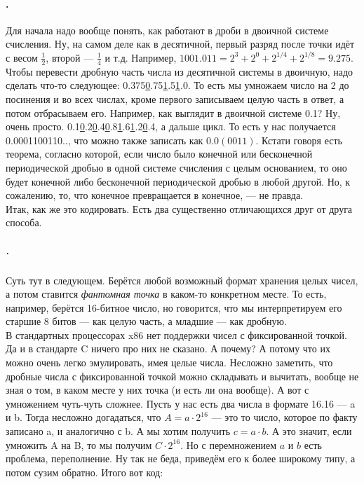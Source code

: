 \documentclass{article}
\begin{document}
    \paragraph{.}
    Для начала надо вообще понять, как работают в дроби в двоичной системе счисления. Ну, на самом деле как в десятичной, первый разряд после точки идёт с весом $\frac12$, второй --- $\frac14$ и т.д. Например, $1001.011=2^3+2^0+2^{1/4}+2^{1/8}=9.275$. Чтобы перевести дробную часть числа из десятичной системы в двоичную, надо сделать что-то следующее: 0.375\textrightarrow\underline0.75\textrightarrow\underline1.5\textrightarrow\underline1.0. То есть мы умножаем число на 2 до посинения и во всех числах, кроме первого записываем целую часть в ответ, а потом отбрасываем его. Например, как выглядит в двоичной системе 0.1? Ну, очень просто. 0.1\textrightarrow\underline0.2\textrightarrow\underline0.4\textrightarrow\underline0.8\textrightarrow\underline1.6\textrightarrow\underline1.2\textrightarrow\underline0.4, а дальше цикл. То есть у нас получается 0.0001100110.., что можно также записать как $0.0(0011)$. Кстати говоря есть теорема, согласно которой, если число было конечной или бесконечной периодической дробью в одной системе счисления с целым основанием, то оно будет конечной либо бесконечной периодической дробью в любой другой. Но, к сожалению, то, что конечное превращается в конечное, --- не правда.\\
    Итак, как же это кодировать. Есть два существенно отличающихся друг от друга способа.
    \subparagraph{.}
    Суть тут в следующем. Берётся любой возможный формат хранения целых чисел, а потом ставится \textit{фантомная точка} в каком-то конкретном месте. То есть, например, берётся 16-битное число, но говорится, что мы интерпретируем его старшие 8 битов --- как целую часть, а младшие --- как дробную.\\
    В стандартных процессорах x86 нет поддержки чисел с фиксированной точкой. Да и в стандарте C ничего про них не сказано. А почему? А потому что их можно очень легко эмулировать, имея целые числа. Несложно заметить, что дробные числа с фиксированной точкой можно складывать и вычитать, вообще не зная о том, в каком месте у них точка (и есть ли она вообще). А вот с умножением чуть-чуть сложнее. Пусть у нас есть два числа в формате 16.16 --- a и b. Тогда несложно догадаться, что $A=a\cdot2^{16}$ --- это то число, которое по факту записано a, и аналогично с b. А мы хотим получить $c=a\cdot b$. А это значит, если умножить A на B, то мы получим $C\cdot2^{16}$. Но с перемножением $a$ и $b$ есть проблема, переполнение. Ну так не беда, приведём его к более широкому типу, а потом сузим обратно. Итого вот код:
\end{document}
